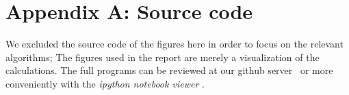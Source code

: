 \section{Appendix A: Source code}
We excluded the source code of the figures here in order to focus on the relevant algorithms; 
The figures used in the report are merely a visualization of the calculations. The full programs can
be reviewed at our github server~\cite{ba_github} or more conveniently with the \textit{ipython notebook viewer} 
\cite{notebook_viewer}.



